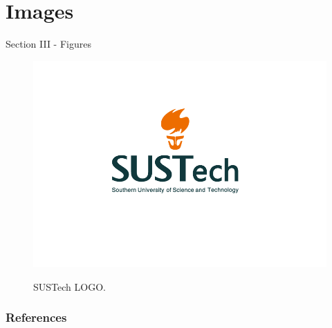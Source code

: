 \documentclass{libs/SUSTech_format}
\begin{document}
\section{Images}
\begin{frame}{Section III - Figures}
    \begin{figure}
        \centering
        \caption{SUSTech LOGO.}
        \includegraphics[scale=0.3]{libs/LOGO.png}
        \label{fig:ufc_emblem}
    \end{figure}
\end{frame}

\begin{frame}[allowframebreaks]
    \frametitle{References}
    \printbibliography
\end{frame}

\end{document}

